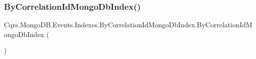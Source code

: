 \subsubsection{\texorpdfstring{By\+Correlation\+Id\+Mongo\+Db\+Index()}{ByCorrelationIdMongoDbIndex()}}
{\footnotesize\ttfamily Cqrs.\+Mongo\+D\+B.\+Events.\+Indexes.\+By\+Correlation\+Id\+Mongo\+Db\+Index.\+By\+Correlation\+Id\+Mongo\+Db\+Index (\begin{DoxyParamCaption}{ }\end{DoxyParamCaption})}

